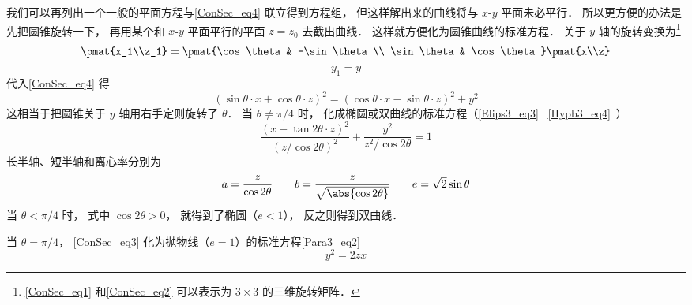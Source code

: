 我们可以再列出一个一般的平面方程与\autoref{ConSec_eq4} 联立得到方程组， 但这样解出来的曲线将与 $x$-$y$ 平面未必平行． 所以更方便的办法是先把圆锥旋转一下， 再用某个和 $x$-$y$ 平面平行的平面 $z = z_0$ 去截出曲线． 这样就方便化为圆锥曲线的标准方程． 关于 $y$ 轴的旋转变换为\footnote{\autoref{ConSec_eq1} 和\autoref{ConSec_eq2} 可以表示为 $3\times 3$ 的三维旋转矩阵．}
\begin{equation}\label{ConSec_eq1}
\pmat{x_1\\z_1} = \pmat{\cos\theta & -\sin\theta\\ \sin\theta & \cos\theta}\pmat{x\\z}
\end{equation}
\begin{equation}\label{ConSec_eq2}
y_1 = y
\end{equation}
代入\autoref{ConSec_eq4} 得
\begin{equation}\label{ConSec_eq3}
(\sin\theta\cdot x + \cos\theta\cdot z)^2 = (\cos\theta\cdot x - \sin\theta\cdot z)^2 + y^2
\end{equation}
这相当于把圆锥关于 $y$ 轴用右手定则旋转了 $\theta$． 当 $\theta \ne \pi/4$ 时， 化成椭圆或双曲线的标准方程（\autoref{Elips3_eq3}~ \autoref{Hypb3_eq4}~）
\begin{equation}
\frac{(x - \tan2\theta \cdot z)^2}{(z/\cos2\theta)^2} + \frac{y^2}{z^2/\cos2\theta} = 1
\end{equation}
长半轴、短半轴和离心率分别为
\begin{equation}
a = \frac{z}{\cos2\theta}
\qquad
b = \frac{z}{\sqrt{\abs{\cos2\theta}}}
\qquad
e = \sqrt{2}\sin\theta
\end{equation}
当 $\theta < \pi/4$ 时， 式中 $\cos2\theta > 0$， 就得到了椭圆（$e < 1$）， 反之则得到双曲线．

当 $\theta = \pi/4$， \autoref{ConSec_eq3} 化为抛物线（$e = 1$）的标准方程\autoref{Para3_eq2}~
\begin{equation}
y^2 = 2zx
\end{equation}
